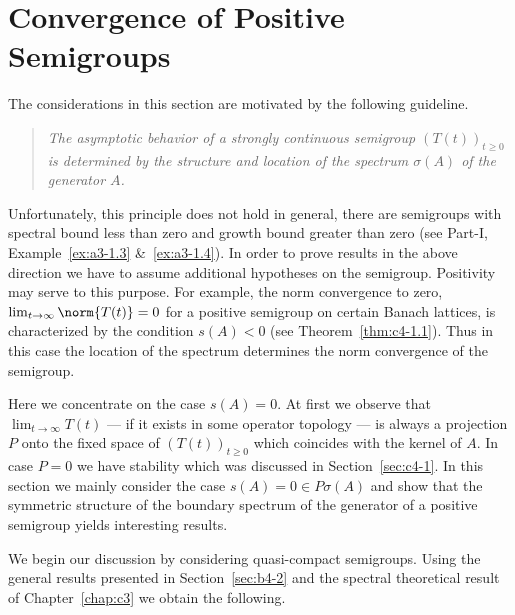 \section{Convergence of Positive Semigroups}\label{sec:c4-2}
%
\hspace{1cm}{\Large by Günther Greiner and Rainer Nagel}
\vspace{.5cm}
\newline
The considerations in this section are motivated by the following guideline.
\begin{quote} 
\textit{The asymptotic behavior of a strongly continuous semigroup $(T(t))_{t \geq 0}$ is determined by the structure and location of the spectrum $\sigma(A)$ of the generator $A$.}
\end{quote}
Unfortunately, this principle does not hold in general, \eg  there are semigroups with spectral bound less than zero and growth bound greater than zero (see Part-I, Example~\ref{ex:a3-1.3} \&~\ref{ex:a3-1.4}).
In order to prove results in the above direction we have to assume additional hypotheses on the semigroup.
Positivity may serve to this purpose.
For example, the norm convergence to zero, \ie  $\lim_{t \to \infty} \norm{T(t)} = 0$ for a positive semigroup on certain Banach lattices, is characterized by the condition $s(A) < 0$ (see Theorem~\ref{thm:c4-1.1}).
Thus in this case the location of the spectrum determines the norm convergence of the semigroup.

Here we concentrate on the case $s(A) = 0$.
At first we observe that
$\lim_{t \to \infty} T(t)$ --- if it exists in some operator topology --- is always a projection $P$ onto the fixed space of\/ $(T(t))_{t \geq 0}$ which coincides with the kernel of\/ $A$.
In case $P = 0$ we have stability which was discussed in Section~\ref{sec:c4-1}.
In this section we mainly consider the case $s(A) = 0 \in P{\sigma}(A)$ and show that the symmetric structure of the boundary spectrum of the generator of a positive semigroup yields interesting results.

We begin our discussion by considering quasi-compact semigroups.
Using the general results presented in Section~\ref{sec:b4-2}  and the spectral theoretical result of Chapter~\ref{chap:c3} we obtain the following.

